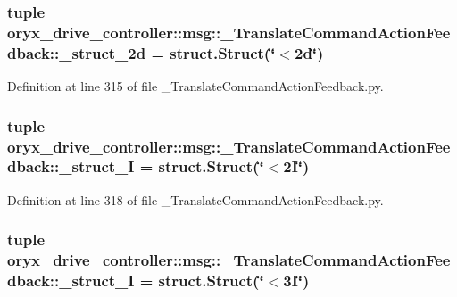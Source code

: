 \subsubsection[{\-\_\-struct\-\_\-2d}]{\setlength{\rightskip}{0pt plus 5cm}tuple {\bf oryx\-\_\-drive\-\_\-controller\-::msg\-::\-\_\-\-Translate\-Command\-Action\-Feedback\-::\-\_\-struct\-\_\-2d} = struct.\-Struct(\char`\"{}$<$2d\char`\"{})}\label{namespaceoryx__drive__controller_1_1msg_1_1__TranslateCommandActionFeedback_a51efcbebd7dfc0da6c4e7800983b1186}


\-Definition at line 315 of file \-\_\-\-Translate\-Command\-Action\-Feedback.\-py.

\subsubsection[{\-\_\-struct\-\_\-2\-I}]{\setlength{\rightskip}{0pt plus 5cm}tuple {\bf oryx\-\_\-drive\-\_\-controller\-::msg\-::\-\_\-\-Translate\-Command\-Action\-Feedback\-::\-\_\-struct\-\_\-I} = struct.\-Struct(\char`\"{}$<$2\-I\char`\"{})}\label{namespaceoryx__drive__controller_1_1msg_1_1__TranslateCommandActionFeedback_afdb5792562d3bdbeded6021cbd30e044}


\-Definition at line 318 of file \-\_\-\-Translate\-Command\-Action\-Feedback.\-py.

\subsubsection[{\-\_\-struct\-\_\-3\-I}]{\setlength{\rightskip}{0pt plus 5cm}tuple {\bf oryx\-\_\-drive\-\_\-controller\-::msg\-::\-\_\-\-Translate\-Command\-Action\-Feedback\-::\-\_\-struct\-\_\-I} = struct.\-Struct(\char`\"{}$<$3\-I\char`\"{})}\label{namespaceoryx__drive__controller_1_1msg_1_1__TranslateCommandActionFeedback_a23bcb93ea23ea29b6c21f058b7a11ffb}


